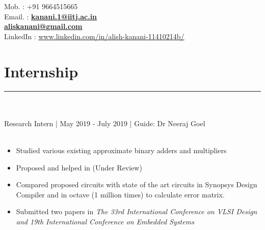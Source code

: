 \documentclass[]{resume}
\begin{document}
\begin{minipage}[t]{0.66\textwidth} 
\hspace*{1pt}\hfill    \\
\hspace*{1pt}\hfill    \\
\hspace*{1pt}\hfill Mob. : +91 9664515665\\ 
\hspace*{1pt}\hfill Email. : \textbf{\href{mailto:kanani.1@iitj.ac.in}{\underline{kanani.1@iitj.ac.in}}} \\
\hspace*{1pt}\hfill \textbf{\href{mailto:aliskanani@gmail.com}{\underline{aliskanani@gmail.com}}} \\
\hspace*{1pt}\hfill 
LinkedIn : {\href{https://www.linkedin.com/in/alish-kanani-11410214b/}{\underline{www.linkedin.com/in/alish-kanani-11410214b/}}} \\

\section{Internship}
\vspace{-0.5em}
\noindent\rule{12.5cm}{0.4pt}

\vspace{0.5em}
\hspace{1em}
\\
\vspace{-1em}\\
\hspace*{1em}Research Intern  | May 2019 - July 2019 | Guide: Dr Neeraj Goel  \\
\vspace{-3.3em}\\
\descript{}
\begin{itemize}
    \item Studied various existing approximate binary adders and multipliers 
    \vspace{-0.6em}\\
    \item Proposed  and helped in  (Under Review)
    \vspace{-0.6em}\\
    \item Compared proposed circuits with state of the art circuits in Synopsys Design Compiler and in octave (1 million times) to calculate error matrix.
    \vspace{-0.6em}
    \item Submitted two papers in \textsl{The 33rd International Conference on VLSI Design and 19th International Conference on Embedded Systems }
\end{itemize}
\sectionsep


\end{minipage}
\end{document}
